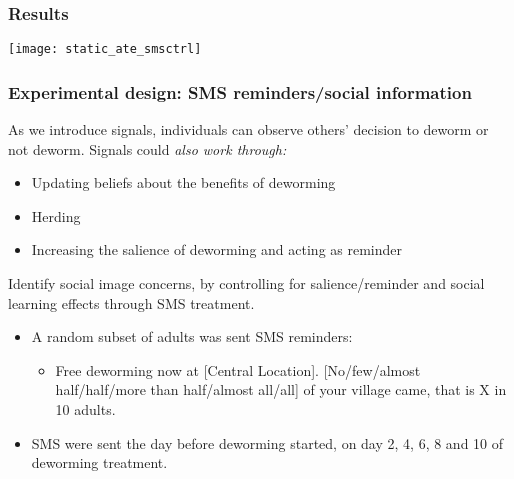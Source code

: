 \documentclass{beamer}
\theoremstyle{plain}
\begin{document}
\begin{frame}[label=slide06]
\frametitle{\large{Results}}
\begin{center}
\texttt{[image: static\_ate\_smsctrl]}
\end{center}
\end{frame}


\begin{frame}[label=slide18]
\frametitle{\large{Experimental design: SMS reminders/social information}}
\small{
As we introduce signals, individuals can observe others' decision to deworm or not deworm. Signals could \it{also} \rm work through:
\begin{itemize}
\item Updating beliefs about the benefits of deworming
\item Herding 
\item Increasing the salience of deworming and acting as reminder 
\end{itemize}}
Identify social image concerns, by controlling for salience/reminder and social learning effects through SMS treatment. 
\begin{itemize}
\item A random subset of adults was sent SMS reminders:
\begin{itemize}
\item Free deworming now at [Central Location]. [No/few/almost half/half/more than half/almost all/all] of your village came, that is X in 10 adults.
\end{itemize}
\item SMS were sent the day before deworming started, on day 2, 4, 6, 8 and 10 of deworming treatment.
\end{itemize}
\end{frame}
\end{document}
